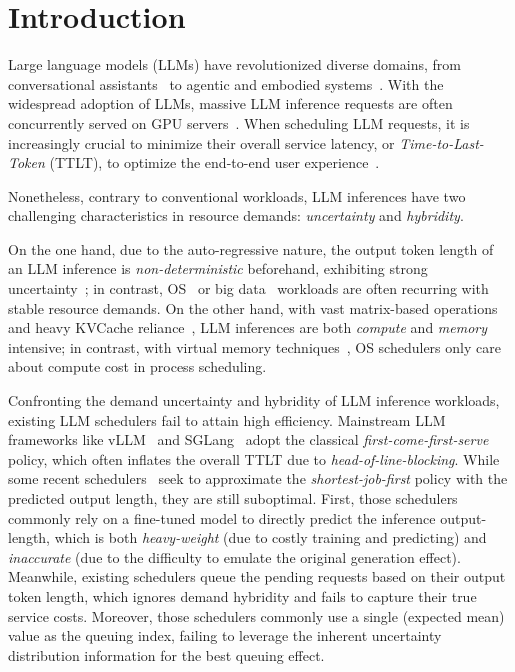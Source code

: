 \section{Introduction}
\label{sec:intro}

Large language models (LLMs) have revolutionized diverse domains, from conversational assistants~\cite{openai_chatgpt,deepseek} to agentic and embodied systems~\cite{chen2023typefly,wang2024llm}.
With the widespread adoption of LLMs, massive LLM inference requests are often concurrently served on GPU servers~\cite{sun2024llumnix}. 
When scheduling LLM requests, it is increasingly crucial to minimize their overall service latency, or \emph{Time-to-Last-Token} (TTLT), to optimize the end-to-end user experience~\cite{shahout2024don,qiu2024efficient}.


Nonetheless, contrary to conventional workloads, LLM inferences have two challenging characteristics in resource demands: \emph{uncertainty} and \emph{hybridity}. 

On the one hand, due to the auto-regressive nature, the output token length of an LLM inference is \emph{non-deterministic} beforehand, exhibiting strong uncertainty~\cite{yu2022orca}; in contrast, OS~\cite{lozi2016linux} or big data~\cite{ousterhout2015making} workloads are often recurring with stable resource demands. 
On the other hand, with vast matrix-based operations and heavy KVCache reliance~\cite{qin2024mooncake}, LLM inferences are both \emph{compute} and \emph{memory} intensive; in contrast, with virtual memory techniques~\cite{abrossimov1989generic}, OS schedulers only care about compute cost in process scheduling.


Confronting the demand uncertainty and hybridity of LLM inference workloads, existing LLM schedulers fail to attain high efficiency. 
Mainstream LLM frameworks like vLLM~\cite{kwon2023efficient} and SGLang~\cite{zheng2024sglang} adopt the classical \emph{first-come-first-serve} policy, which often inflates the overall TTLT due to \emph{head-of-line-blocking}. 
While some recent schedulers~\cite{shahout2024don,qiu2024efficient,fu2024efficient} seek to approximate the \emph{shortest-job-first} policy with the predicted output length, they are still suboptimal. 
{First}, those schedulers commonly rely on a fine-tuned model to directly predict the inference output-length, which is both \emph{heavy-weight} (due to costly training and predicting) and \emph{inaccurate} (due to the difficulty to emulate the original generation effect).
Meanwhile, existing schedulers queue the pending requests based on their output token length, which ignores demand hybridity and fails to capture their true service costs.
Moreover, those schedulers commonly use a single (expected mean) value as the queuing index, failing to leverage the inherent uncertainty distribution information for the best queuing effect.




